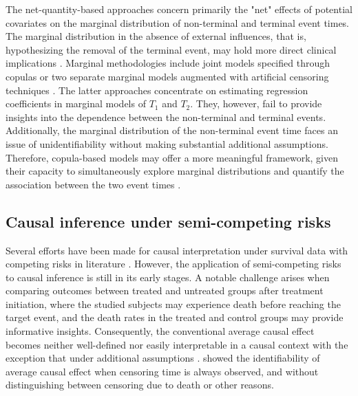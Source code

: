 \documentclass[APA,Times1COL]{WileyNJDv5} %
\theoremstyle{plain}
\begin{document}
The net-quantity-based approaches concern primarily the "net" effects of potential covariates on the marginal distribution of non-terminal and terminal event times. The marginal distribution in the absence of external influences, that is, hypothesizing the removal of the terminal event, may hold more direct clinical implications \citep{varadhan2014semicompeting}. Marginal methodologies include joint models specified through copulas \citep{peng2007semicompeting,chen2012semicompeting,peng2018semicompeting} or two separate marginal models augmented with artificial censoring techniques \citep{peng2006artificial,Ding2009artificial}. 
The latter approaches concentrate on estimating regression coefficients in marginal models of $T_1$ and $T_2$.
They, however, fail to provide insights into the dependence between the non-terminal and terminal events. 
Additionally, the marginal distribution of the non-terminal event time faces an issue of unidentifiability without making substantial additional assumptions.  
Therefore, copula-based models may offer a more meaningful framework, given their capacity to simultaneously explore marginal distributions and quantify the association between the two event times \citep{emura2021conditional,sun2023penalised,wei2023bivariate,yu2023unified}.

\subsection{Causal inference under semi-competing risks}

Several efforts have been made for causal interpretation under survival data with competing risks in literature \citep{young2020,stensrud2021generalized,stensrud2022}. %
However, the application of semi-competing risks to causal inference is still in its early stages. A notable challenge arises when comparing outcomes between treated and untreated groups after treatment initiation, where the studied subjects may experience death before reaching the target event, and the death rates in the treated and control groups may provide informative insights. Consequently, the conventional average causal effect becomes neither well-defined nor easily interpretable in a causal context with the exception that under additional assumptions  \citep{Nevo2022semicompeting, axelrod2022sensitivity}. \cite{robins1995analytic} showed the identifiability of average causal effect when censoring time is always observed, and without distinguishing between censoring due to death or other reasons. 
\end{document}
